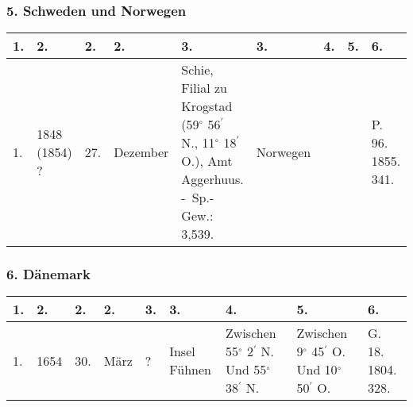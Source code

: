 \documentclass[a4paper, 11pt, oneside, polutonikogreek, german]{article}
\begin{document}
\clearpage
\begin{landscape}
\subsubsection{5. Schweden und Norwegen}
\begin{table}[!ht]
    \centering
    \begin{tabular}{|l|p{17mm}|l|l|p{48mm}|l|l|l|p{13mm}|}
    \hline
        1. & 2. & 2. & 2. & 3. & 3. & 4. & 5. & 6. \\ \hline
        1. & 1848 (1854) ? & 27. & Dezember & Schie, Filial zu Krogstad (59$^\circ$ 56$^\prime$ N., 11$^\circ$ 18$^\prime$ O.), Amt Aggerhuus. - Sp.-Gew.: 3,539. & Norwegen & ~ & ~ & P. 96. 1855. 341. \\ \hline
    \end{tabular}
\end{table}
\end{landscape}
\clearpage
\begin{landscape}
\subsubsection{6. Dänemark}
\begin{table}[!ht]
    \centering
    \begin{tabular}{|l|l|l|l|l|l|l|l|p{13mm}|}
    \hline
        1. & 2. & 2. & 2. & 3. & 3. & 4. & 5. & 6. \\ \hline
        1. & 1654 & 30. & März & ? & Insel Fühnen & Zwischen 55$^\circ$ 2$^\prime$ N. Und 55$^\circ$ 38$^\prime$ N. & Zwischen 9$^\circ$ 45$^\prime$ O. Und 10$^\circ$ 50$^\prime$ O. & G. 18. 1804. 328. \\ \hline
    \end{tabular}
\end{table}
\end{landscape}
\clearpage
\end{document}
